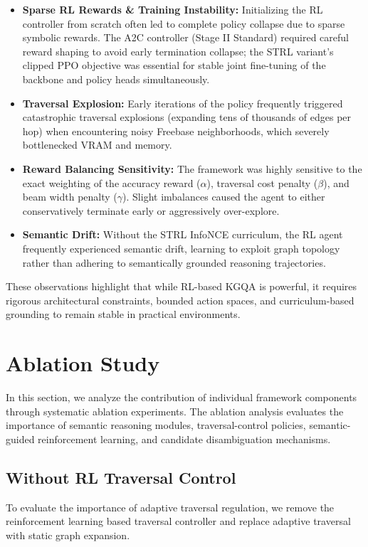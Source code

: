 \documentclass[10pt,conference]{IEEEtran}
\begin{document}
\begin{itemize}
\item \textbf{Sparse RL Rewards \& Training Instability:} Initializing the RL controller from scratch often led to complete policy collapse due to sparse symbolic rewards. The A2C controller (Stage II Standard) required careful reward shaping to avoid early termination collapse; the STRL variant's clipped PPO objective was essential for stable joint fine-tuning of the backbone and policy heads simultaneously.
\item \textbf{Traversal Explosion:} Early iterations of the policy frequently triggered catastrophic traversal explosions (expanding tens of thousands of edges per hop) when encountering noisy Freebase neighborhoods, which severely bottlenecked VRAM and memory.
\item \textbf{Reward Balancing Sensitivity:} The framework was highly sensitive to the exact weighting of the accuracy reward ($\alpha$), traversal cost penalty ($\beta$), and beam width penalty ($\gamma$). Slight imbalances caused the agent to either conservatively terminate early or aggressively over-explore.
\item \textbf{Semantic Drift:} Without the STRL InfoNCE curriculum, the RL agent frequently experienced semantic drift, learning to exploit graph topology rather than adhering to semantically grounded reasoning trajectories.
\end{itemize}

These observations highlight that while RL-based KGQA is powerful, it requires rigorous architectural constraints, bounded action spaces, and curriculum-based grounding to remain stable in practical environments.

\section{Ablation Study}

In this section, we analyze the contribution of individual framework components through systematic ablation experiments. The ablation analysis evaluates the importance of semantic reasoning modules, traversal-control policies, semantic-guided reinforcement learning, and candidate disambiguation mechanisms.

\subsection{Without RL Traversal Control}

To evaluate the importance of adaptive traversal regulation, we remove the reinforcement learning based traversal controller and replace adaptive traversal with static graph expansion.
\end{document}
